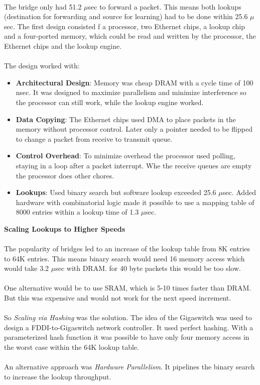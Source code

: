\\
The bridge only had 51.2 $\mu $sec to forward a packet. This means both lookups (destination for forwarding and source for learning) had to be done within 25.6 $\mu $sec. The first design consisted f a processor, two Ethernet chips, a lookup chip and a four-ported memory, which could be read and written by the processor, the Ethernet chips and the lookup engine.\\
\\
The design worked with:
\begin{itemize}
\item \textbf{Architectural Design}: Memory was cheap DRAM with a cycle time of 100 nsec. It was designed to maximize parallelism and minimize interference so the processor can still work, while the lookup engine worked.
\item \textbf{Data Copying}: The Ethernet chips used DMA to place packets in the memory without processor control. Later only a pointer needed to be flipped to change a packet from receive to transmit queue.
\item \textbf{Control Overhead}: To minimize overhead the processor used polling, staying in a loop after a packet interrupt. Whe  the receive queues are empty the processor does other chores.
\item \textbf{Lookups}: Used binary search but software lookup exceeded 25.6 $\mu $sec. Added hardware with combinatorial logic made it possible to use a mapping table of 8000 entries within a lookup time of 1.3 $\mu $sec.
\end{itemize}
\textbf{Scaling Lookups to Higher Speeds}\\
\\
The popularity of bridges led to an increase of the lookup table from 8K entries to 64K entries. This means binary search would need 16 memory access which would take 3.2 $\mu $sec with DRAM. for 40 byte packets this would be too slow.\\
\\
One alternative would be to use SRAM, which is 5-10 times faster than DRAM. But this was expensive and would not work for the next speed increment.\\
\\
So \textit{Scaling via Hashing} was the solution. The idea of the Gigaswitch was used to design a FDDI-to-Gigaswitch network controller. It used perfect hashing. With a parameterized hash function it was possible to have only four memory access in the worst case within the 64K lookup table.\\
\\
An alternative approach was \textit{Hardware Parallelism}. It pipelines the binary search to increase the lookup throughput. 